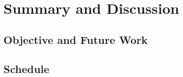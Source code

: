 \chapter{Summary and Discussion}
\label{chap:plano}

\section{Objective and Future Work}
\label{sec:objt}

\section{Schedule}
\label{sec:sched}
